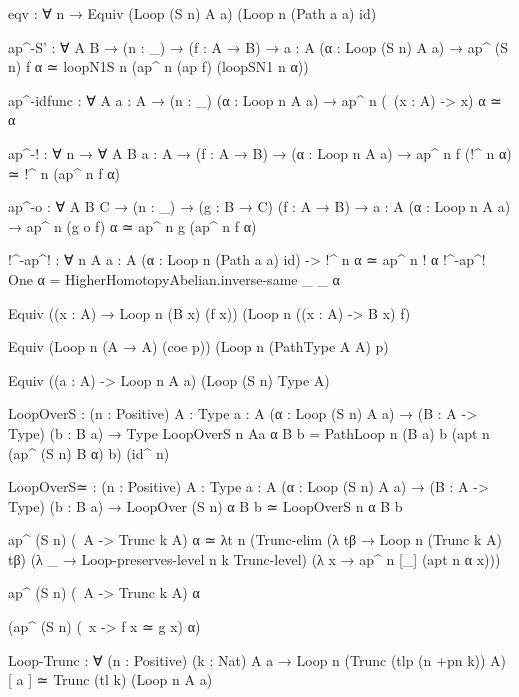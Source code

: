 {  eqv : ∀ n → Equiv (Loop (S n) A a) (Loop n (Path a a) id) 

  ap^-S' : ∀ {A B} → (n : _) → (f : A → B) → {a : A} 
                    (α : Loop (S n) A a)
                  → ap^ (S n) f α ≃ loopN1S n (ap^ n (ap f) (loopSN1 n α))

  ap^-idfunc : ∀ {A} {a : A} → (n : _) (α : Loop n A a) → ap^ n (\ (x : A) -> x) α ≃ α

  ap^-! : ∀ n → ∀ {A B} {a : A} → (f : A → B) → (α : Loop n A a)
          → ap^ n f (!^ n α) ≃ !^ n (ap^ n f α)

  ap^-o : ∀ {A B C} → (n : _) → (g : B → C) (f : A → B)
          → {a : A} (α : Loop n A a)
          → ap^ n (g o f) α ≃ ap^ n g (ap^ n f α) 
  
  
  !^-ap^! : ∀ n {A} {a : A} (α : Loop n (Path a a) id) -> !^ n α ≃ ap^ n ! α
  !^-ap^! One α = HigherHomotopyAbelian.inverse-same _ _ α

  
  Equiv ((x : A) → Loop n (B x) (f x)) (Loop n ((x : A) -> B x) f)

  Equiv (Loop n (A → A) (coe p)) (Loop n (Path{Type} A A) p)

  Equiv ((a : A) -> Loop n A a) (Loop (S n) Type A)

  LoopOverS :  (n : Positive) {A : Type} {a : A} (α : Loop (S n) A a) 
             → (B : A -> Type) (b : B a) → Type
  LoopOverS n {A}{a} α B b = 
    Path{Loop n (B a) b} 
        (apt n (ap^ (S n) B α) b)
        (id^ n)

    LoopOverS≃ : (n : Positive) {A : Type} {a : A} (α : Loop (S n) A a) → (B : A -> Type) (b : B a) 
               → LoopOver (S n) α B b ≃ LoopOverS n α B b 

    ap^ (S n) (\ A -> Trunc k A) α ≃ λt n (Trunc-elim (λ tβ → Loop n (Trunc k A) tβ)
                                                      (λ _ → Loop-preserves-level n k Trunc-level) 
                                                      (λ x → ap^ n [_] (apt n α x))) 

    ap^ (S n) (\ A -> Trunc k A) α

    (ap^ (S n) (\ x -> f x ≃ g x) α)

    Loop-Trunc : ∀ (n : Positive) (k : Nat) {A} {a} → Loop n (Trunc (tlp (n +pn k)) A) [ a ] ≃ Trunc (tl k) (Loop n A a)
}
